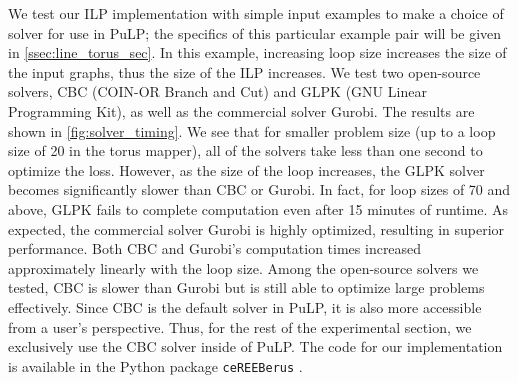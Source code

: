     We test our ILP implementation with simple input examples to make a choice of solver for use in PuLP; 
    the specifics of this particular example pair will be given in \cref{ssec:line_torus_sec}.
    In this example, increasing loop size increases the size of the input graphs, thus the size of the ILP increases.
   We test two open-source solvers, CBC (COIN-OR Branch and Cut) and GLPK (GNU Linear Programming Kit), as well as the commercial solver Gurobi. 
    The results are shown in \cref{fig:solver_timing}.
    We see that for smaller problem size (up to a loop size of 20 in the torus mapper), all of the solvers take less than one second to optimize the loss.
    However, as the size of the loop increases, the GLPK solver becomes significantly slower than CBC or Gurobi. 
    In fact, for loop sizes of 70 and above, GLPK fails to complete computation even after 15 minutes of runtime.
    As expected, the commercial solver Gurobi is highly optimized, resulting in superior performance. 
    Both CBC and Gurobi's computation times increased approximately linearly with the loop size.    
    Among the open-source solvers we tested, CBC is slower than Gurobi but is still able to optimize large problems effectively.
    Since CBC is the default solver in PuLP, it is also more accessible from a user’s perspective.
    Thus, for the rest of the experimental section, we exclusively use the CBC solver inside of PuLP.
    The code for our implementation is available in the Python package \texttt{ceREEBerus} \cite{cereeberus}.
    
    
       
%


%
%
%
%
%
%
%
%
%
%
%
%
%





 



%
%
%
%
%
%
%
%
%
%
%
%
%
%
%
%
%
%
%
%
%
%
     
    







%
%

%
%
%
%
%
%
%
%
%
%
%

%
%




